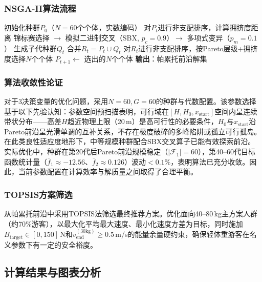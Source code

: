 \documentclass[12pt,a4paper]{ctexart}
\begin{document}
\subsubsection{NSGA-II算法流程}

\begin{algorithm}[H]
  \caption{NSGA-II多目标优化}
  \label{alg:nsga2}
  \begin{algorithmic}[1]
    \State 初始化种群$P_0$（$N=60$个个体，实数编码）
      \State 对$P_t$进行非支配排序，计算拥挤度距离
      \State 锦标赛选择 $\to$ 模拟二进制交叉（SBX, $p_c=0.9$）$\to$ 多项式变异（$p_m=0.1$）
      \State 生成子代种群$Q_t$
      \State 合并$R_t = P_t \cup Q_t$
      \State 对$R_t$进行非支配排序，按Pareto层级+拥挤度选择$N$个个体
      \State $P_{t+1} \gets$ 选出的$N$个个体
    \EndFor
    \State \textbf{输出}：帕累托前沿解集
  \end{algorithmic}
\end{algorithm}

\subsubsection{算法收敛性论证}

对于3决策变量的优化问题，采用$N=60, G=60$的种群与代数配置。该参数选择基于以下先验认知：参数空间预扫描表明，可行域在$[H, H_0, x_{\text{start}}]$空间内呈连续带状分布——高差$H$趋近物理上限（20\,m）是高可行性的必要条件，$H_0$与$x_{\text{start}}$沿Pareto前沿呈光滑单调的互补关系，不存在极度破碎的多峰陷阱或孤立可行孤岛。在此类良性适应度地形下，中等规模种群配合SBX交叉算子已能有效探索前沿。实际优化中，种群在第20代后Pareto前沿规模稳定（$|\mathcal{F}_1|=60$），第40--60代目标函数统计量（$\bar{f}_1\approx -12.56$、$\bar{f}_2\approx 0.126$）波动$<0.1\%$，表明算法已充分收敛。因此，当前参数配置在计算效率与解质量之间取得了合理平衡。

\subsubsection{TOPSIS方案筛选}

从帕累托前沿中采用TOPSIS法筛选最终推荐方案。优化面向40--80\,kg主方案人群（约70\%游客），以最大化平均最大速度、最小化速度方差为目标，同时施加$B_{\text{target}}\in[0,150]$\,N和$v_{\text{end}}^{(30\text{kg})}\geq 0.5$\,m/s的能量余量硬约束，确保轻体重游客在名义参数下有一定的安全裕度。

\subsection{计算结果与图表分析}
\end{document}

